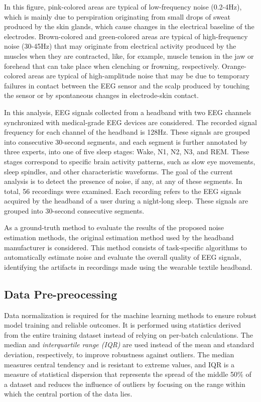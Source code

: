 \documentclass[conference]{IEEEtran}
\begin{document}
In this figure, pink-colored areas are typical of low-frequency noise (0.2-4Hz), which is mainly due to perspiration originating from small drops of sweat produced by the skin glands, which cause changes in the electrical baseline of the electrodes. Brown-colored and green-colored areas are typical of high-frequency noise (30-45Hz) that may originate from electrical activity produced by the muscles when they are contracted, like, for example, muscle tension in the jaw or forehead that can take place when clenching or frowning, respectively. Orange-colored areas are typical of high-amplitude noise that may be due to temporary failures in contact between the EEG sensor and the scalp produced by touching the sensor or by spontaneous changes in electrode-skin contact.

In this analysis, EEG signals collected from a headband with two EEG channels synchronized with medical-grade EEG devices are considered. The recorded signal frequency for each channel of the headband is 128Hz. These signals are grouped into consecutive 30-second segments, and each segment is further annotated by three experts, into one of five sleep stages: Wake, N1, N2, N3, and REM. These stages correspond to specific brain activity patterns, such as slow eye movements, sleep spindles, and other characteristic waveforms. The goal of the current analysis is to detect the presence of noise, if any, at any of these segments. In total, 56 recordings were examined. Each recording refers to the EEG signals acquired by the headband of a user during a night-long sleep. These signals are grouped into 30-second consecutive segments.

As a ground-truth method to evaluate the results of the proposed noise estimation methods, the original estimation method used by the headband manufacturer is considered. This method consists of task-specific algorithms to automatically estimate noise and evaluate the overall quality of EEG signals, identifying the artifacts in recordings made using the wearable textile headband.


\subsection{Data Pre-preocessing}

Data normalization is required for the machine learning methods to
ensure robust model training and reliable outcomes. It is performed
using statistics derived from the entire training dataset instead of
relying on per-batch calculations. The median and
\emph{interquartile range (IQR)} are used instead of the mean and
standard deviation, respectively, to improve robustness against
outliers. The median measures central tendency and is resistant to
extreme values, and IQR is a measure of statistical dispersion that
represents the spread of the middle 50\% of a dataset and reduces the
influence of outliers by focusing on the range within which the
central portion of the data lies.
\end{document}
